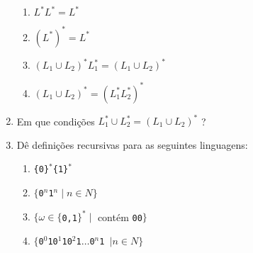 \documentclass[a4paper,12pt]{article}
\begin{document}
\begin{enumerate}
\begin{enumerate}
                \item $L^{\ast}L^{\ast}=L^{\ast}$ 
                \item $(L^{\ast})^{\ast}=L^{\ast}$
		\item $(L_{1}\cup L_{2})^{\ast} L_{1}^{\ast} = ( L_{1}\cup L_{2})^{\ast}$
                \item $(L_{1}\cup L_{2})^{\ast} = ( L_{1}^{\ast}L_{2}^{\ast})^{\ast}$
		\end{enumerate}
	\item Em que condições $L_{1}^{\ast} \cup L_{2}^{\ast} = ( L_{1} \cup L_{2})^{\ast}$ ?
	\item Dê definições recursivas para as seguintes linguagens:
               \begin{enumerate}
		\item\texttt{\{0\}$^{\ast}$\{1\}$^{\ast}$}
		\item\texttt{$\{$0$^{n}$1$^{n} \mid n \in N \}$} 
		\item\texttt{$\{ \omega \in \{$0,1$\}^{\ast} \mid$} contém \texttt{00$\}$} 	
		\item\texttt{$\{$0$^{0}$10$^{1}$10$^{2}$1$\ldots$0$^{n}$1 $ \mid n \in N \}$ }

		\end{enumerate}
\end{enumerate}
\end{document}
